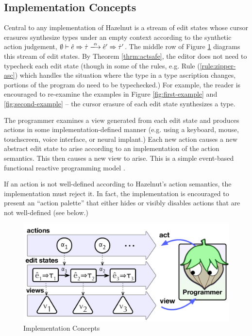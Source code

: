 \subsection{Implementation Concepts}
Central to any implementation of Hazelnut is a stream of edit states whose cursor erasures synthesize types under an empty context according to the synthetic action judgement, $\performSyn{\emptyset}{\zexp}{\htau}{\alpha}{\zexp'}{\htau'}$. The middle row of Figure \ref{fig:impl-overview} diagrams this stream of edit states. By Theorem \ref{thrm:actsafe}, the editor does not need to typecheck each edit state (though in some of the rules, e.g. Rule (\ref{rule:zipper-asc}) which handles the situation where the type in a type ascription changes, portions of the program do need to be typechecked.) For example, the reader is encouraged to re-examine the examples in Figure \ref{fig:first-example} and \ref{fig:second-example} -- the cursor erasure of each edit state synthesizes a type.

The programmer examines a view generated from each edit state and produces actions in some implementation-defined manner (e.g. using a keyboard, mouse, touchscreen, voice interface, or neural implant.) Each new action causes a new abstract edit state to arise according to an implementation of the action semantics. This then causes a new view to arise. This is a simple event-based functional reactive programming model \cite{Wan:2000:FRP:349299.349331}. 

If an action is not well-defined according to Hazelnut's action semantics, the implementation must reject it. In fact, the implementation is encouraged to present an ``action palette'' that either hides or visibly disables actions that are not well-defined (see below.)



\begin{figure}
\centering
\includegraphics[width=\columnwidth]{impl-overview2}
\caption{Implementation Concepts}
\label{fig:impl-overview}
\end{figure}

